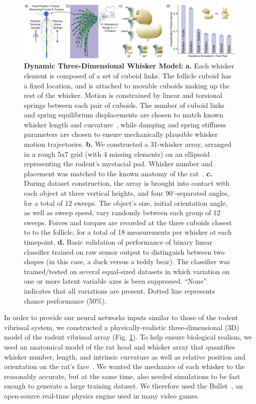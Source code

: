 \begin{figure}
\centering
\includegraphics [width=1\linewidth]{figures/whiskers.pdf}
\vspace{-3mm}
\caption{\footnotesize{\textbf{Dynamic Three-Dimensional Whisker Model:} \textbf{a.} Each whisker element is composed of a set of cuboid links. 
The follicle cuboid has a fixed location, and is attached to movable cuboids making up the rest of the whisker. 
Motion is constrained by linear and torsional springs between each pair of cuboids. 
The number of cuboid links and spring equilibrium displacements are chosen to match known whisker length and curvature~\cite{Towal2011}, while damping and spring stiffness parameters are chosen to ensure mechanically plausible whisker motion trajectories.  
\textbf{b.} We constructed a 31-whisker array, arranged in a rough 5x7 grid (with 4 missing elements) on an ellipsoid representing the rodent's mystacial pad.  Whisker number and placement was matched to the known anatomy of the rat~\cite{Towal2011}.
\textbf{c.} During dataset construction, the array is brought into contact with each object at three vertical heights, and four 90$^{\circ}$-separated angles, for a total of 12 sweeps.  
The object's size, initial orientation angle, as well as sweep speed, vary randomly between each group of 12 sweeps. 
Forces and torques are recorded at the three cuboids closest to to the follicle, for a total of 18 measurements per whisker at each timepoint. 
\textbf{d.} Basic validation of performance of binary linear classifier trained on raw sensor output to distinguish between two shapes (in this case, a duck versus a teddy bear).  The classifier was trained/tested on several equal-sized datasets in which variation on one or more latent variable axes is been suppressed. ``None'' indicates that all variations are present.  Dotted line represents chance performance (50\%).}~\label{fig_whiskers}}
\vspace{-6mm}
\end{figure}

In order to provide our neural networks inputs similar to those of the rodent vibrissal system, we constructed a physically-realistic three-dimensional (3D) model of the rodent vibrissal array (Fig. \ref{fig_whiskers}).  
To help ensure biological realism, we used an anatomical model of the rat head and whisker array that quantifies whisker number, length, and intrinsic curvature as well as relative position and orientation on the rat's face~\cite{Towal2011}.
We wanted the mechanics of each whisker to the reasonably accurate, but at the same time, also needed simulations to be fast enough to generate a large training dataset.   
We therefore used the Bullet~\cite{wiki:bullet}, an open-source real-time physics engine used in many video games. 

